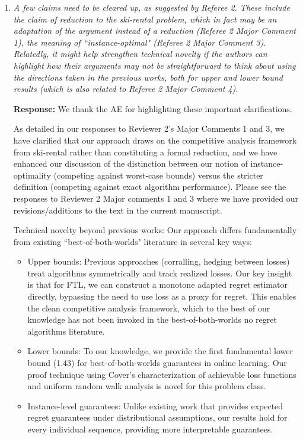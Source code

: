 \documentclass[11pt]{article}
\begin{document}
\begin{enumerate}
    {\bf Response:} We thank the AE for this comment. We have reviewed all theorem statements and added missing definitions, setting descriptions and context wherever missing, as also suggested in comments by Reviewer 2. 


    \item \emph{A few claims need to be cleared up, as suggested by Referee 2. These include the claim of reduction to the ski-rental problem, which in fact may be an adaptation of the argument instead of a reduction (Referee 2 Major Comment 1), the meaning of ``instance-optimal" (Referee 2 Major Comment 3). Relatedly, it might help strengthen technical novelty if the authors can highlight how their arguments may not be straightforward to think about using the directions taken in the previous works, both for upper and lower bound results (which is also related to Referee 2 Major Comment 4).}


    {\bf Response:} We thank the AE for highlighting these important clarifications.
    
    As detailed in our responses to Reviewer 2's Major Comments 1 and 3, we have clarified that our approach draws on the competitive analysis framework from ski-rental rather than constituting a formal reduction, and we have enhanced our discussion of the distinction between our notion of instance-optimality (competing against worst-case bounds) versus the stricter definition (competing against exact algorithm performance). Please see the responses to Reviewer 2 Major comments 1 and 3 where we have provided our revisions/additions to the text in the current manuscript.


    Technical novelty beyond previous works: Our approach differs fundamentally from existing ``best-of-both-worlds" literature in several key ways:

    \begin{itemize}
        \item Upper bounds: Previous approaches (corralling, hedging between losses) treat algorithms symmetrically and track realized losses. Our key insight is that for FTL, we can construct a monotone adapted regret estimator directly, bypassing the need to use loss as a proxy for regret. This enables the clean competitive analysis framework, which to the best of our knowledge has not been invoked in the best-of-both-worlds no regret algorithms literature. 

        \item Lower bounds: To our knowledge, we provide the first fundamental lower bound (1.43) for best-of-both-worlds guarantees in online learning. Our proof technique using Cover's characterization of achievable loss functions and uniform random walk analysis is novel for this problem class.

        \item Instance-level guarantees: Unlike existing work that provides expected regret guarantees under distributional assumptions, our results hold for every individual sequence, providing more interpretable guarantees.
    \end{itemize}


    
  
\end{enumerate}
\end{document}
